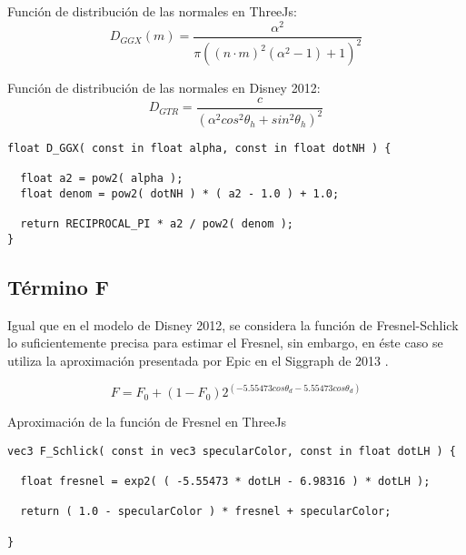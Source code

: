   Funci\'on de distribuci\'on de las normales en ThreeJs:\\

  \begin{equation}
    D_{GGX}(m) = \frac{\alpha^2}{\pi((n\cdotp{m})^2(\alpha^2 - 1 ) + 1)^2}
  \end{equation}
  \singlespacing

  Funci\'on de distribuci\'on de las normales en Disney 2012:\\

  \begin{equation}
    D_{GTR} = \frac
    {c}
    {(\alpha^2 cos^2 \theta_h + sin^2 \theta_h)^2}
  \end{equation}
  \singlespacing

  \begin{lstlisting}[caption=Implementaci\'on en ThreeJs del t\'ermino de geometr\'ia]
float D_GGX( const in float alpha, const in float dotNH ) {

  float a2 = pow2( alpha );
  float denom = pow2( dotNH ) * ( a2 - 1.0 ) + 1.0;

  return RECIPROCAL_PI * a2 / pow2( denom );
}
  \end{lstlisting}
  \singlespacing

  \subsection*{T\'ermino F}
  Igual que en el modelo de Disney 2012, se considera la funci\'on de Fresnel-Schlick lo suficientemente precisa para
  estimar el Fresnel, sin embargo, en \'este caso se utiliza la aproximaci\'on presentada por Epic en el Siggraph de 2013 \autocite{unreal}.\\

  \begin{eqfloat}
    \begin{equation}
      F= F_0 + (1 - F_0)2^{(-5.55473cos\theta_d - 5.55473cos\theta_d)}
    \end{equation}
  \caption{Aproximaci\'on de la funci\'on de Fresnel en ThreeJs}
  \end{eqfloat}


  \begin{lstlisting}[caption=Implementaci\'on en ThreeJs de la aproximaci\'on a la funci\'on de Fresnel]
vec3 F_Schlick( const in vec3 specularColor, const in float dotLH ) {

  float fresnel = exp2( ( -5.55473 * dotLH - 6.98316 ) * dotLH );

  return ( 1.0 - specularColor ) * fresnel + specularColor;

}
  \end{lstlisting}

